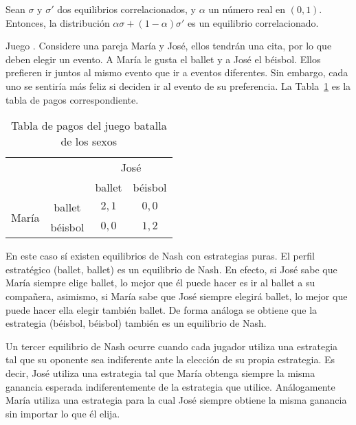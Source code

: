 
\begin{theorem}
Sean $\sigma$ y $\sigma'$ dos equilibrios correlacionados, y $\alpha$ un número real en $(0,1)$. Entonces, la distribución $\alpha\sigma + (1-\alpha)\sigma'$ es un equilibrio correlacionado.
\end{theorem}

\begin{example}
\label{ex:batalla-sexos}
Juego . Considere una pareja María y José, ellos tendrán una cita, por lo que deben elegir un evento. A María le gusta el ballet y a José el béisbol. Ellos prefieren ir juntos al mismo evento que ir a eventos diferentes. Sin embargo, cada uno se sentiría más feliz si deciden ir al evento de su preferencia. La Tabla~\ref{table:pagos-batallas-sexo} es la tabla de pagos correspondiente.
\end{example}

\begin{table}
\begin{center}
\caption{Tabla de pagos del juego batalla de los sexos}
\label{table:pagos-batallas-sexo}
\begin{tabular}{ c c | c | c |}
 & \multicolumn{1}{c}{} & \multicolumn{2}{c}{José} \\
 & \multicolumn{1}{c}{} & \multicolumn{1}{c}{ballet} & \multicolumn{1}{c}{béisbol}  \\ \cline{3-4}
 \multirow{2}{*}{María}
 & ballet  & $2, 1$ & $0, 0$ \\ \cline{3-4}
 & béisbol & $0, 0$ & $1, 2$ \\ \cline{3-4}
\end{tabular}
\end{center}
\end{table}

En este caso sí existen equilibrios de Nash con estrategias puras. El perfil estratégico (ballet, ballet) es un equilibrio de Nash. En efecto, si José sabe que María siempre elige ballet, lo mejor que él puede hacer es ir al ballet a su compañera, asimismo, si María sabe que José siempre elegirá ballet, lo mejor que puede hacer ella elegir también ballet. De forma análoga se obtiene que la estrategia (béisbol, béisbol) también es un equilibrio de Nash.

Un tercer equilibrio de Nash ocurre cuando cada jugador utiliza una estrategia tal que su oponente sea indiferente ante la elección de su propia estrategia. Es decir, José utiliza una estrategia tal que María obtenga siempre la misma ganancia esperada indiferentemente de la estrategia que utilice. Análogamente María utiliza una estrategia para la cual José siempre obtiene la misma ganancia sin importar lo que él elija.

